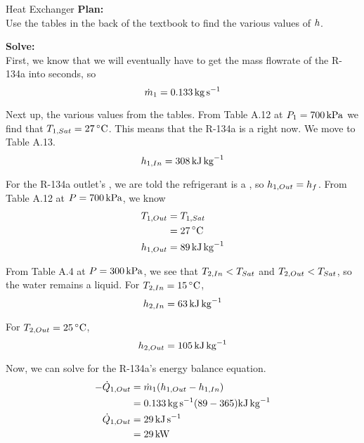 \begin{example}{Heat Exchanger}
  \textbf{Plan:} \\
  Use the tables in the back of the textbook to find the various values of $h$.

  \textbf{Solve:} \\
  First, we know that we will eventually have to get the mass flowrate of the R-134a into seconds, so
  \begin{equation*}
    \dot{m}_{1} = \SI{0.133}{\kilo\gram\per\second}
  \end{equation*}

  Next up, the various  values from the tables.
  From Table A.12 at $P_{1} = \SI{700}{\kilo\pascal}$ we find that $\Temp_{1, Sat} = \SI{27}{\degreeCelsius}$.
  This means that the R-134a is a  right now.
  We move to Table A.13.
  \begin{equation*}
    h_{1, In} = \SI{308}{\kilo\joule\per\kilo\gram}
  \end{equation*}

  For the R-134a outlet's , we are told the refrigerant is a , so $h_{1, Out} = h_{f}$.
  From Table A.12 at $P = \SI{700}{\kilo\pascal}$, we know
  \begin{align*}
    \Temp_{1, Out} &= \Temp_{1, Sat} \\
                   &= \SI{27}{\degreeCelsius} \\
    \SpecificEnthalpy_{1, Out} &= \SI{89}{\kilo\joule\per\kilo\gram}
  \end{align*}

  From Table A.4 at $P = \SI{300}{\kilo\pascal}$, we see that $T_{2,In} < T_{Sat}$ and $T_{2, Out} < T_{Sat}$, so the water remains a liquid.
  For $\Temp_{2, In} = \SI{15}{\degreeCelsius}$,
  \begin{equation*}
    h_{2, In} = \SI{63}{\kilo\joule\per\kilo\gram}
  \end{equation*}

  For $\Temp_{2, Out} = \SI{25}{\degreeCelsius}$,
  \begin{equation*}
    h_{2, Out} = \SI{105}{\kilo\joule\per\kilo\gram}
  \end{equation*}

  Now, we can solve for the R-134a's energy balance equation.
  \begin{align*}
    -\dot{Q}_{1, Out} &= \dot{m}_{1} (h_{1, Out} - h_{1, In}) \\
                               &= \SI{0.133}{\kilo\gram\per\second} (89-365)\si{\kilo\joule\per\kilo\gram} \\
    \dot{Q}_{1, Out} &= \SI{29}{\kilo\joule\per\second} \\
                               &= \SI{29}{\kilo\watt}
  \end{align*}


\end{example}
